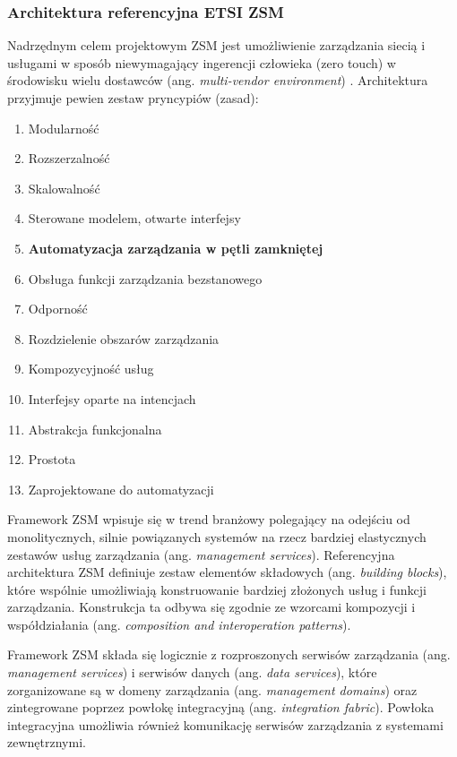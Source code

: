 \subsubsection{Architektura referencyjna ETSI ZSM}\hypertarget{sec:zsm}{}
Nadrzędnym celem projektowym ZSM jest umożliwienie zarządzania siecią i usługami w sposób niewymagający ingerencji człowieka (zero touch) w środowisku wielu dostawców (ang. \textit{multi-vendor environment}) \cite{etsizsm2018}. Architektura przyjmuje pewien zestaw pryncypiów (zasad):
\begin{enumerate}\hypertarget{list:2}{}
    \item Modularność  
    \item Rozszerzalność  
    \item Skalowalność  
    \item Sterowane modelem, otwarte interfejsy  
    \item \textbf{Automatyzacja zarządzania w pętli zamkniętej}  
    \item Obsługa funkcji zarządzania bezstanowego  
    \item Odporność  
    \item Rozdzielenie obszarów zarządzania  
    \item Kompozycyjność usług  
    \item Interfejsy oparte na intencjach  
    \item Abstrakcja funkcjonalna  
    \item Prostota  
    \item Zaprojektowane do automatyzacji  
\end{enumerate}

Framework ZSM wpisuje się w trend branżowy polegający na odejściu od monolitycznych, silnie powiązanych systemów na rzecz bardziej elastycznych zestawów usług zarządzania (ang. \textit{management services}). Referencyjna architektura ZSM definiuje zestaw elementów składowych (ang. \textit{building blocks}), które wspólnie umożliwiają konstruowanie bardziej złożonych usług i funkcji zarządzania. Konstrukcja ta odbywa się zgodnie ze wzorcami kompozycji i współdziałania (ang. \textit{composition and interoperation patterns}). 

Framework ZSM składa się logicznie z rozproszonych serwisów zarządzania (ang. \textit{management services}) i serwisów danych (ang. \textit{data services}), które zorganizowane są w domeny zarządzania (ang. \textit{management domains}) oraz zintegrowane poprzez powłokę integracyjną (ang. \textit{integration fabric}). Powłoka integracyjna umożliwia również komunikację serwisów zarządzania z systemami zewnętrznymi.

